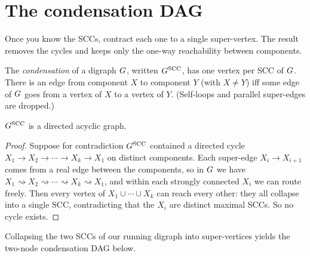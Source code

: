 \section{The condensation DAG}
\label{ch05:condensation}

Once you know the SCCs, contract each one to a single super-vertex. The result removes the cycles and keeps only the one-way reachability between components.

\begin{definition}[Condensation]
\label{ch05:def-condensation}
The \emph{condensation} of a digraph $G$, written $G^{\mathrm{SCC}}$, has one vertex per SCC of $G$. There is an edge from component $X$ to component $Y$ (with $X\ne Y$) iff some edge of $G$ goes from a vertex of $X$ to a vertex of $Y$. (Self-loops and parallel super-edges are dropped.)
\end{definition}

\begin{theorem}
\label{ch05:thm-dag}
$G^{\mathrm{SCC}}$ is a directed acyclic graph.
\end{theorem}

\begin{proof}
Suppose for contradiction $G^{\mathrm{SCC}}$ contained a directed cycle $X_1\to X_2\to\cdots\to X_k\to X_1$ on distinct components. Each super-edge $X_i\to X_{i+1}$ comes from a real edge between the components, so in $G$ we have $X_1\rightsquigarrow X_2\rightsquigarrow\cdots\rightsquigarrow X_k\rightsquigarrow X_1$, and within each strongly connected $X_i$ we can route freely. Then every vertex of $X_1\cup\cdots\cup X_k$ can reach every other: they all collapse into a single SCC, contradicting that the $X_i$ are distinct maximal SCCs. So no cycle exists.
\end{proof}

Collapsing the two SCCs of our running digraph into super-vertices yields the two-node condensation DAG below.

\begin{center}
\end{center}


